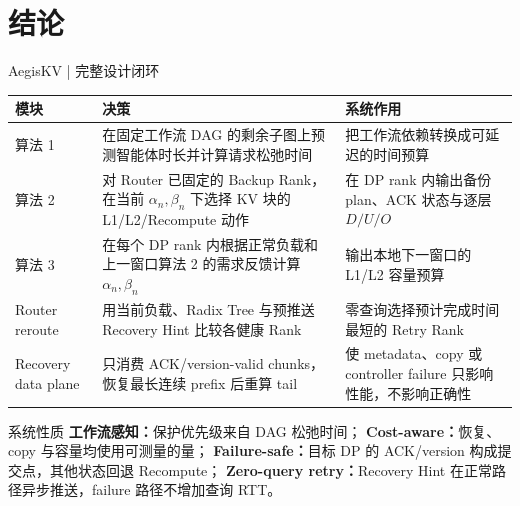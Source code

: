 \section{结论}

\begin{frame}{AegisKV | 完整设计闭环}
  \tiny
  \renewcommand{\arraystretch}{1.03}
  \begin{tabularx}{\textwidth}{p{}p{}X}
    \toprule
    模块 & 决策 & 系统作用 \\
    \midrule
    算法 1
      & 在固定工作流 DAG 的剩余子图上预测智能体时长并计算请求松弛时间
      & 把工作流依赖转换成可延迟的时间预算 \\
    算法 2
      & 对 Router 已固定的 Backup Rank，在当前 $\alpha_n,\beta_n$ 下选择 KV 块的 L1/L2/Recompute 动作
      & 在 DP rank 内输出备份 plan、ACK 状态与逐层 $D/U/O$ \\
    算法 3
      & 在每个 DP rank 内根据正常负载和上一窗口算法 2 的需求反馈计算 $\alpha_n,\beta_n$
      & 输出本地下一窗口的 L1/L2 容量预算 \\
    Router reroute
      & 用当前负载、Radix Tree 与预推送 Recovery Hint 比较各健康 Rank
      & 零查询选择预计完成时间最短的 Retry Rank \\
    Recovery data plane
      & 只消费 ACK/version-valid chunks，恢复最长连续 prefix 后重算 tail
      & 使 metadata、copy 或 controller failure 只影响性能，不影响正确性 \\
    \bottomrule
  \end{tabularx}

  \vspace{0.05cm}
  \begin{block}{系统性质}
    \tiny
    \textbf{工作流感知：}保护优先级来自 DAG 松弛时间；
    \textbf{Cost-aware：}恢复、copy 与容量均使用可测量的量；
    \textbf{Failure-safe：}目标 DP 的 ACK/version 构成提交点，其他状态回退 Recompute；
    \textbf{Zero-query retry：}Recovery Hint 在正常路径异步推送，failure 路径不增加查询 RTT。
  \end{block}

  \vspace{0.02cm}
\end{frame}
